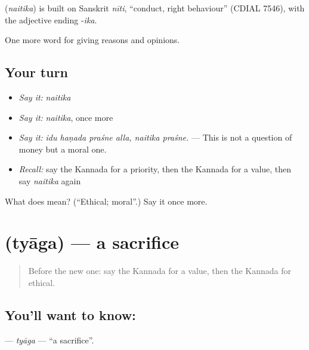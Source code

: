\begin{cousinweb}
\textbf{} (\emph{naitika}) is built on Sanskrit \emph{nīti}, \textquotedblleft{}conduct, right behaviour\textquotedblright{} (CDIAL 7546), with the adjective ending -\emph{ika}.
\end{cousinweb}

\begin{grammarlens}[title={What you've built}]
One more word for giving reasons and opinions.
\end{grammarlens}

\subsection*{Your turn}
\begin{itemize}
\raggedright
  \item \emph{Say it:} \emph{naitika}
  \item \emph{Say it:} \emph{naitika}, once more
  \item \emph{Say it:} \emph{idu haṇada praśne alla, naitika praśne.} — This is not a question of money but a moral one.
  \item \emph{Recall:} say the Kannada for a priority, then the Kannada for a value, then say \emph{naitika} again
\end{itemize}

\begin{tcolorbox}[breakable,colback=teal!4,colframe=teal!35!black,title={Before you move on}]
What does  mean? (\textquotedblleft{}Ethical; moral\textquotedblright{}.) Say it once more.
\end{tcolorbox}
\section[\texorpdfstring{\kn{ತ್ಯಾಗ} (tyāga)}{ತ್ಯಾಗ (tyāga)}]{ (tyāga) — a sacrifice}

\label{lesson:KA-C388-tyaga}



\begin{quote}
Before the new one: say the Kannada for a value, then the Kannada for ethical.
\end{quote}

\subsection*{You'll want to know: }
\textbf{} — \emph{tyāga} — \textquotedblleft{}a sacrifice\textquotedblright{}.

